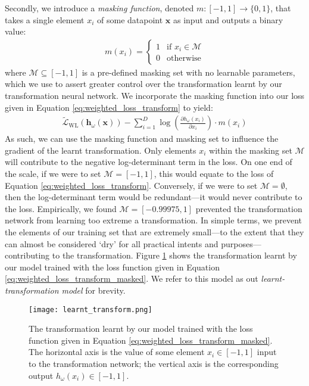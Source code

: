 \documentclass[ oneside,%
                    author={George Herbert},
                    degree={MSci},
                     title={Diffusion Models for Time-Evolving Precipitation Fields},
                  subtitle={}]{dissertation}
\begin{document}
Secondly, we introduce a \textit{masking function}, denoted $m:[-1,1]\to \{0,1\}$, that takes a single element $x_i$ of some datapoint $\mathbf{x}$ as input and outputs a binary value:
\begin{align}
      m(x_i)=\begin{cases}
            1 & \text{if } x_i\in \mathcal{M}\\
            0 & \text{otherwise}
      \end{cases}
\end{align}
where $\mathcal{M}\subseteq[-1, 1]$ is a pre-defined masking set with no learnable parameters, which we use to assert greater control over the transformation learnt by our transformation neural network. We incorporate the masking function into our loss given in Equation \ref{eq:weighted_loss_transform} to yield:
\begin{align}
      \tilde{\mathcal{L}}_{\mathrm{WL}}(\mathbf{h}_\omega(\mathbf{x})) - \sum_{i=1}^D \log \left(\frac{\partial h_\omega(x_i)}{\partial x_i}\right)\cdot m(x_i)\label{eq:weighted_loss_transform_masked}
\end{align}
As such, we can use the masking function and masking set to influence the gradient of the learnt transformation. Only elements $x_i$ within the masking set $\mathcal{M}$ will contribute to the negative log-determinant term in the loss. On one end of the scale, if we were to set $\mathcal{M}=[-1,1]$, this would equate to the loss of Equation \ref{eq:weighted_loss_transform}. Conversely, if we were to set $\mathcal{M}=\emptyset$, then the log-determinant term would be redundant---it would never contribute to the loss. Empirically, we found $\mathcal{M}=[-0.99975, 1]$ prevented the transformation network from learning too extreme a transformation. In simple terms, we prevent the elements of our training set that are extremely small---to the extent that they can almost be considered `dry' for all practical intents and purposes---contributing to the transformation. Figure \ref{fig:learnt_transform} shows the transformation learnt by our model trained with the loss function given in Equation \ref{eq:weighted_loss_transform_masked}. We refer to this model as out \textit{learnt-transformation model} for brevity.

\begin{figure}[htbp]
      \centering
      \texttt{[image: learnt\_transform.png]}
      \caption{The transformation learnt by our model trained with the loss function given in Equation \ref{eq:weighted_loss_transform_masked}. The horizontal axis is the value of some element $x_i\in[-1, 1]$ input to the transformation network; the vertical axis is the corresponding output $h_\omega(x_i)\in [-1, 1]$.}
      \label{fig:learnt_transform}
\end{figure}
\end{document}

